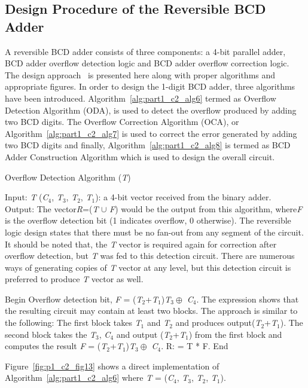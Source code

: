 \subsection{Design Procedure of the Reversible BCD Adder}

A reversible BCD adder consists of three components: a 4-bit parallel adder, BCD adder overflow detection logic and BCD adder overflow correction logic. The design approach~ is presented here along with proper algorithms and appropriate figures. In order to design the 1-digit BCD adder, three algorithms have been introduced. Algorithm~\ref{alg:part1_c2_alg6} termed as Overflow Detection Algorithm (ODA), is used to detect the overflow produced by adding two BCD digits. The Overflow Correction Algorithm (OCA), or Algorithm~\ref{alg:part1_c2_alg7} is used to correct the error generated by adding two BCD digits and finally, Algorithm~\ref{alg:part1_c2_alg8} is termed as BCD Adder Construction Algorithm which is used to design the overall circuit.


\begin{algorithm}[!tbh]
\caption{Overflow Detection Algorithm ({\it T})}
\label{alg:part1_c2_alg6}
Input: {\it T }({\it C}${}_{4}$, {\it T}${}_{3}$, {\it T}${}_{2}$, {\it T}${}_{1}$): a 4-bit vector received from the binary adder.\\
Output: The vector{\it R}=({\it T} ${\cup }$ {\it F}) would be the output from this algorithm, where{\it F} is the overflow detection bit (1 indicates overflow, 0 otherwise). The reversible logic design states that there must be no fan-out from any segment of the circuit. It should be noted that, the {\it T }vector is required again for correction after overflow detection, but {\it T }was fed to this detection circuit. There are numerous ways of generating copies of {\it T }vector at any level, but this detection circuit is preferred to produce {\it T }vector as well.
\begin{algorithmic}[1]
\STATE Begin
\STATE Overflow detection bit, {\it F }= ({\it T}${}_{2}$+{\it T}${}_{1}$){\it T}${}_{3}\oplus$ {\it C}${}_{4}$. The expression shows that the resulting circuit may contain at least two blocks. The approach is similar to the following:
\STATE The first block takes {\it T}${}_{1}$ and {\it T}${}_{2}$ and produces output({\it T}${}_{2}$+{\it T}${}_{1}$).
\STATE The second block takes the {\it T}${}_{3}$, {\it C}${}_{4}$ and output ({\it T}${}_{2}$+{\it T}${}_{1}$) from the first block and computes the result {\it F } = ({\it T}${}_{2}$+{\it T}${}_{1}$){\it T}${}_{3}\oplus$ {\it C}${}_{4}$.
 R: = T * F.
\STATE End
\end{algorithmic}
\end{algorithm}
\begin{example}\textnormal{
Figure~\ref{fig:p1_c2_fig13} shows a direct implementation of Algorithm~\ref{alg:part1_c2_alg6} where {\it T }= ({\it C}${}_{4}$, {\it T}${}_{3}$, {\it T}${}_{2}$, {\it T}${}_{1}$).}

\end{example}


